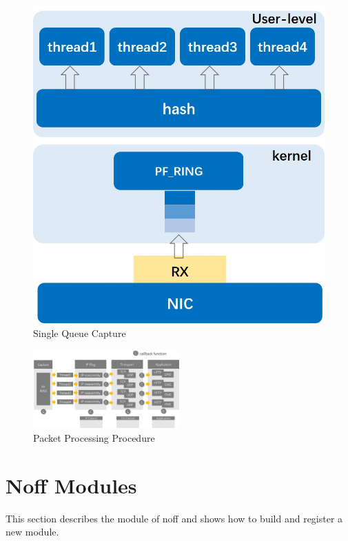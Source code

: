 \documentclass[conference]{IEEEtran}
\begin{document}
\begin{figure}
\begin{minipage}[t]{0.495\linewidth}
\includegraphics[width=\textwidth]{./picture/Figure2.jpg}
\caption{Single Queue Capture}
\label{fig:2}
\end{minipage}
\end{figure} 

\begin{figure}[htbp]
  \centering
  \includegraphics[width=0.5\textwidth]{./picture/Figure3.jpg}
  \caption{Packet Processing Procedure}
  \label{fig:3}
\end{figure}

\section{Noff Modules}
This section describes the module of noff and shows how to build and register a new module.
\end{document}
